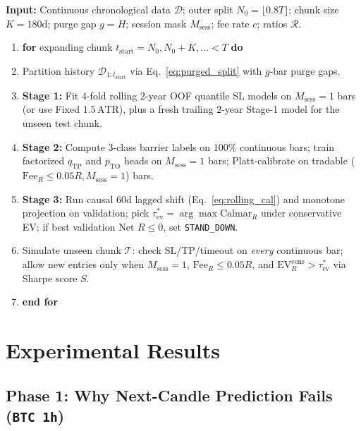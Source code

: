 \documentclass{article}
\newcommand{\EVR}{\mathrm{EV}_R}
\newcommand{\FeeR}{\mathrm{Fee}_R}
\newcommand{\TP}{\mathrm{TP}}
\newcommand{\ATR}{\mathrm{ATR}}
\begin{document}
\begin{algorithm}[t]
\caption{Leakage-Free Continuous-Candle Walk-Forward Multi-R:R Training and Execution (V2.2)}
\label{alg:multirr}
\small
\textbf{Input:} Continuous chronological data $\mathcal{D}$; outer split $N_0 = \lfloor 0.8T \rfloor$; chunk size $K = 180\text{d}$; purge gap $g = H$; session mask $M_{\mathrm{sess}}$; fee rate $c$; ratios $\mathcal{R}$.
\begin{enumerate}
  \item \textbf{for} expanding chunk $t_{\mathrm{start}} = N_0, N_0+K, \dots < T$ \textbf{do}
  \item \quad Partition history $\mathcal{D}_{1:t_{\mathrm{start}}}$ via Eq.~\eqref{eq:purged_split} with $g$-bar purge gaps.
  \item \quad \textbf{Stage 1:} Fit $4$-fold rolling $2$-year OOF quantile SL models on $M_{\mathrm{sess}}=1$ bars (or use Fixed $1.5\,\ATR$), plus a fresh trailing $2$-year Stage-1 model for the unseen test chunk.
  \item \quad \textbf{Stage 2:} Compute 3-class barrier labels on $100\%$ continuous bars; train factorized $q_{\TP}$ and $p_{\mathrm{TO}}$ heads on $M_{\mathrm{sess}}=1$ bars; Platt-calibrate on tradable ($\FeeR \le 0.05R, M_{\mathrm{sess}}=1$) bars.
  \item \quad \textbf{Stage 3:} Run causal $60$d lagged shift (Eq.~\eqref{eq:rolling_cal}) and monotone projection on validation; pick $\tau^*_{\mathrm{ev}} = \arg\max \mathrm{Calmar}_R$ under conservative EV; if best validation $\text{Net }R \le 0$, set \texttt{STAND\_DOWN}.
  \item \quad Simulate unseen chunk $\mathcal{T}$: check SL/TP/timeout on \emph{every} continuous bar; allow new entries only when $M_{\mathrm{sess}}=1$, $\FeeR \le 0.05R$, and $\EVR^{\mathrm{cons}} > \tau^*_{\mathrm{ev}}$ via Sharpe score $S$.
  \item \textbf{end for}
\end{enumerate}
\end{algorithm}

\section{Experimental Results}
\label{sec:results}

\subsection{Phase 1: Why Next-Candle Prediction Fails (\texttt{BTC 1h})}
\label{sec:phase1_results}
\end{document}

